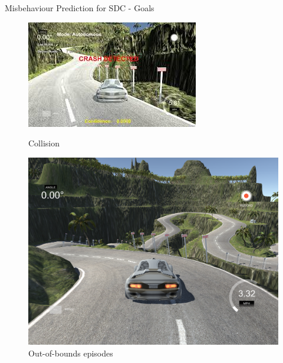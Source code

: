 \documentclass[aspectratio=1610,17pt,utf8]{beamer}
\begin{document}
\begin{frame}{Misbehaviour Prediction for SDC - Goals}
  \begin{figure}[!htb]
    \begin{minipage}{0.48\textwidth}
      \centering
      \includegraphics[width=1\linewidth]{fig00.jpeg}
      \caption{Collision}
      \label{Fig:Data1}
    \end{minipage}\hfill
    \begin{minipage}{0.48\textwidth}
      \centering
      \includegraphics[width=1\linewidth]{fig01.png}
      \caption{Out-of-bounds episodes}
      \label{Fig:Data2}
    \end{minipage}
  \end{figure}
\end{frame}

\end{document}
